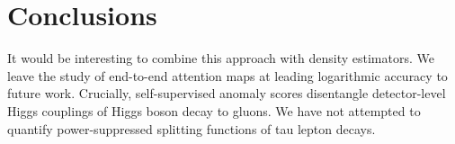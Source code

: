 \section{Conclusions}\label{sec:conclusions}

It would be interesting to combine this approach with density
estimators. We leave the study of end-to-end attention maps at leading
logarithmic accuracy to future work. Crucially, self-supervised anomaly
scores disentangle detector-level Higgs couplings of Higgs boson decay
to gluons. We have not attempted to quantify power-suppressed splitting
functions of tau lepton decays.

